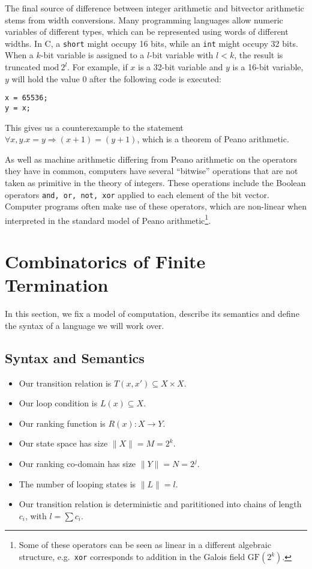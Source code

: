 \documentclass[preprint]{sigplanconf}
\theoremstyle{definition}
\begin{document}
The final source of difference between integer arithmetic and bitvector
arithmetic stems from width conversions.  Many programming languages allow
numeric variables of different types, which can be represented using words
of different widths.  In C, a \texttt{short} might occupy 16 bits, while an
\texttt{int} might occupy 32 bits.  When a $k$-bit variable is assigned to a
$l$-bit variable with $l < k$, the result is truncated $\mathrm{mod}~2^l$.  For
example, if $x$ is a 32-bit variable and $y$ is a 16-bit variable, $y$ will
hold the value $0$ after the following code is executed:
%
\begin{lstlisting}
x = 65536;
y = x;
\end{lstlisting}

This gives us a counterexample to the statement $\forall x, y . x = y
\Rightarrow (x + 1) = (y + 1)$, which is a theorem of Peano arithmetic.

As well as machine arithmetic differing from Peano arithmetic on the
operators they have in common, computers have several ``bitwise'' operations
that are not taken as primitive in the theory of integers.  These operations
include the Boolean operators \texttt{and, or, not, xor} applied to each
element of the bit vector.  Computer programs often make use of these
operators, which are non-linear when interpreted in the standard model of
Peano arithmetic\footnote{Some of these operators can be seen as
linear in a different algebraic structure, e.g.~\texttt{xor} corresponds to
addition in the Galois field $\mathrm{GF}(2^k)$.}.

\iffalse
\section{Combinatorics of Finite Termination}
In this section, we fix a model of computation, describe its semantics and
define the syntax of a language we will work over.

\subsection{Syntax and Semantics}

\begin{itemize}
 \item Our transition relation is $T(x, x') \subseteq X \times X$.
 \item Our loop condition is $L(x) \subseteq X$.
 \item Our ranking function is $R(x) : X \to Y$.
 \item Our state space has size $\| X \| = M = 2^k$.
 \item Our ranking co-domain has size $\| Y \| = N = 2^j$.
 \item The number of looping states is $\| L \| = l$.
 \item Our transition relation is deterministic and parititioned into chains of length $c_i$, with $l = \sum c_i$.
\end{itemize}
\end{document}
